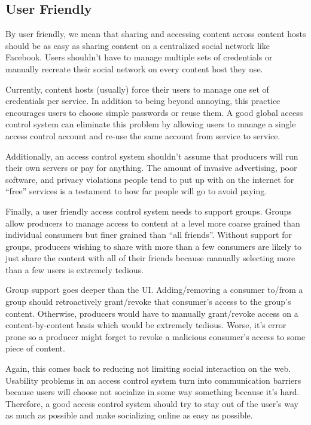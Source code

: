 \documentclass[pdftex,12pt,a4papaer,twoside,notitlepage]{report}
\begin{document}
\subsection{User Friendly}
\label{sub:goal-user}

By user friendly, we mean that sharing and accessing content across content
hosts should be as easy as sharing content on a centralized social network like
Facebook. Users shouldn't have to manage multiple sets of credentials or
manually recreate their social network on every content host they use.

Currently, content hosts (usually) force their users to manage one set of
credentials per service. In addition to being beyond annoying, this practice
encourages users to choose simple passwords or reuse them. A good global access
control system can eliminate this problem by allowing users to manage a single
access control account and re-use the same account from service to service.

Additionally, an access control system shouldn't assume that producers will run
their own servers or pay for anything. The amount of invasive advertising, poor
software, and privacy violations people tend to put up with on the internet for
``free'' services is a testament to how far people will go to avoid paying.

Finally, a user friendly access control system needs to support groups. Groups
allow producers to manage access to content at a level more coarse grained than
individual consumers but finer grained than ``all friends''. Without support for
groups, producers wishing to share with more than a few consumers are likely to
just share the content with all of their friends because manually selecting more
than a few users is extremely tedious.

Group support goes deeper than the UI. Adding/removing a consumer to/from a
group should retroactively grant/revoke that consumer's access to the group's
content. Otherwise, producers would have to manually grant/revoke access on a
content-by-content basis which would be extremely tedious. Worse, it's error
prone so a producer might forget to revoke a malicious consumer's access to some
piece of content.

Again, this comes back to reducing not limiting social interaction on the web.
Usability problems in an access control system turn into communication barriers
because users will choose not socialize in some way something because it's hard.
Therefore, a good access control system should try to stay out of the user's way
as much as possible and make socializing online as easy as possible.
\end{document}
